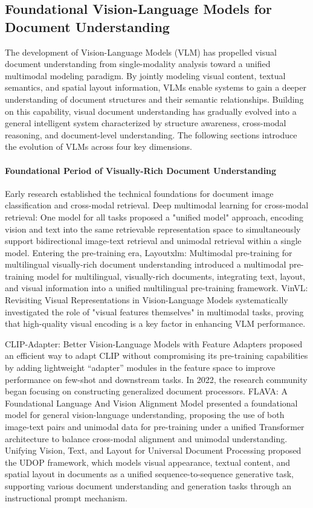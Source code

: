 \subsection{Foundational Vision-Language Models for Document Understanding}
The development of Vision-Language Models (VLM) has propelled visual document understanding from single-modality analysis toward a unified multimodal modeling paradigm. By jointly modeling visual content, textual semantics, and spatial layout information, VLMs enable systems to gain a deeper understanding of document structures and their semantic relationships. Building on this capability, visual document understanding has gradually evolved into a general intelligent system characterized by structure awareness, cross-modal reasoning, and document-level understanding. The following sections introduce the evolution of VLMs across four key dimensions.

\paragraph{Foundational Period of Visually-Rich Document Understanding}
Early research established the technical foundations for document image classification and cross-modal retrieval. Deep multimodal learning for cross-modal retrieval: One model for all tasks \cite{wei2020deep} proposed a "unified model" approach, encoding vision and text into the same retrievable representation space to simultaneously support bidirectional image-text retrieval and unimodal retrieval within a single model. Entering the pre-training era, Layoutxlm: Multimodal pre-training for multilingual visually-rich document understanding \cite{xu2021layoutxlm} introduced a multimodal pre-training model for multilingual, visually-rich documents, integrating text, layout, and visual information into a unified multilingual pre-training framework. VinVL: Revisiting Visual Representations in Vision-Language Models \cite{zhang2021vinvl} systematically investigated the role of "visual features themselves" in multimodal tasks, proving that high-quality visual encoding is a key factor in enhancing VLM performance.

CLIP-Adapter: Better Vision-Language Models with Feature Adapters \cite{gao2021clipadapter} proposed an efficient way to adapt CLIP without compromising its pre-training capabilities by adding lightweight ``adapter'' modules in the feature space to improve performance on few-shot and downstream tasks. In 2022, the research community began focusing on constructing generalized document processors. FLAVA: A Foundational Language And Vision Alignment Model \cite{singh2022flava} presented a foundational model for general vision-language understanding, proposing the use of both image-text pairs and unimodal data for pre-training under a unified Transformer architecture to balance cross-modal alignment and unimodal understanding. Unifying Vision, Text, and Layout for Universal Document Processing \cite{li2022udop} proposed the UDOP framework, which models visual appearance, textual content, and spatial layout in documents as a unified sequence-to-sequence generative task, supporting various document understanding and generation tasks through an instructional prompt mechanism.

